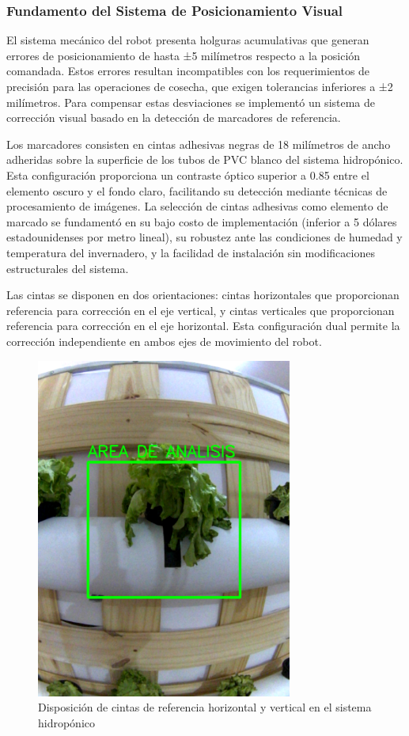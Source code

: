 \subsubsection{Fundamento del Sistema de Posicionamiento Visual}

El sistema mecánico del robot presenta holguras acumulativas que generan errores de posicionamiento de hasta ±5 milímetros respecto a la posición comandada. Estos errores resultan incompatibles con los requerimientos de precisión para las operaciones de cosecha, que exigen tolerancias inferiores a ±2 milímetros. Para compensar estas desviaciones se implementó un sistema de corrección visual basado en la detección de marcadores de referencia.

Los marcadores consisten en cintas adhesivas negras de 18 milímetros de ancho adheridas sobre la superficie de los tubos de PVC blanco del sistema hidropónico. Esta configuración proporciona un contraste óptico superior a 0.85 entre el elemento oscuro y el fondo claro, facilitando su detección mediante técnicas de procesamiento de imágenes. La selección de cintas adhesivas como elemento de marcado se fundamentó en su bajo costo de implementación (inferior a 5 dólares estadounidenses por metro lineal), su robustez ante las condiciones de humedad y temperatura del invernadero, y la facilidad de instalación sin modificaciones estructurales del sistema.

Las cintas se disponen en dos orientaciones: cintas horizontales que proporcionan referencia para corrección en el eje vertical, y cintas verticales que proporcionan referencia para corrección en el eje horizontal. Esta configuración dual permite la corrección independiente en ambos ejes de movimiento del robot.

\begin{figure}[h]
\centering
\includegraphics[width=0.75\textwidth]{imagenes/configuracion_cintas_referencia.png}
\caption{Disposición de cintas de referencia horizontal y vertical en el sistema hidropónico}
\label{fig:configuracion_cintas}
\end{figure}

